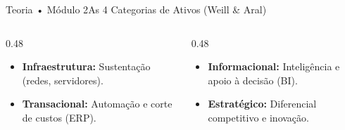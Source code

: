 \begin{senaiframe}{Teoria • Módulo 2}{As 4 Categorias de Ativos (Weill \& Aral)}
  \begin{columns}[t]
    \begin{column}{0.48\textwidth}
      \begin{tcolorbox}[senaicard, title={Infraestrutura \& Transacional}]
        \begin{itemize}
          \item \textbf{Infraestrutura:} Sustentação (redes, servidores).
          \item \textbf{Transacional:} Automação e corte de custos (ERP).
        \end{itemize}
      \end{tcolorbox}
    \end{column}
    \begin{column}{0.48\textwidth}
      \begin{tcolorbox}[senairedcard, title={Informacional \& Estratégico}]
        \begin{itemize}
          \item \textbf{Informacional:} Inteligência e apoio à decisão (BI).
          \item \textbf{Estratégico:} Diferencial competitivo e inovação.
        \end{itemize}
      \end{tcolorbox}
    \end{column}
  \end{columns}
\end{senaiframe}

